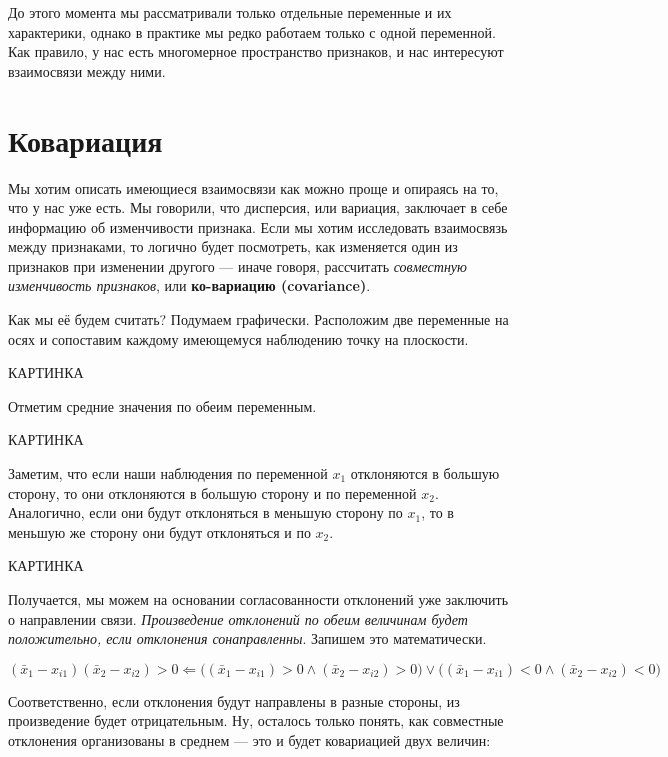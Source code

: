 \documentclass[
  letterpaper,
  DIV=11,
  numbers=noendperiod]{scrreprt}
\newcommand{\median}{\mathrm{median}}
\newcommand{\mean}{\mathbb{M}}
\newcommand{\skew}{\mathrm{skew}}
\newcommand{\kurt}{\mathrm{kurt}}
\theoremstyle{definition}
\theoremstyle{remark}
\begin{document}
\newcommand{\median}{\text{median}}
\newcommand{\mean}{\mathbb{M}}
\newcommand{\skew}{\mathrm{skew}}
\newcommand{\kurt}{\mathrm{kurt}}

До этого момента мы рассматривали только отдельные переменные и их
характерики, однако в практике мы редко работаем только с одной
переменной. Как правило, у нас есть многомерное пространство признаков,
и нас интересуют взаимосвязи между ними.

\section{Ковариация}\label{andan-corr-cov}

Мы хотим описать имеющиеся взаимосвязи как можно проще и опираясь на то,
что у нас уже есть. Мы говорили, что дисперсия, или вариация, заключает
в себе информацию об изменчивости признака. Если мы хотим исследовать
взаимосвязь между признаками, то логично будет посмотреть, как
изменяется один из признаков при изменении другого --- иначе говоря,
рассчитать \emph{совместную изменчивость признаков}, или
\textbf{ко-вариацию (covariance)}.

Как мы её будем считать? Подумаем графически. Расположим две переменные
на осях и сопоставим каждому имеющемуся наблюдению точку на плоскости.

КАРТИНКА

Отметим средние значения по обеим переменным.

КАРТИНКА

Заметим, что если наши наблюдения по переменной \(x_1\) отклоняются в
большую сторону, то они отклоняются в большую сторону и по переменной
\(x_2\). Аналогично, если они будут отклоняться в меньшую сторону по
\(x_1\), то в меньшую же сторону они будут отклоняться и по \(x_2\).

КАРТИНКА

Получается, мы можем на основании согласованности отклонений уже
заключить о направлении связи. \emph{Произведение отклонений по обеим
величинам будет положительно, если отклонения сонаправленны}. Запишем
это математически.

\[
(\bar x_1 - x_{i1}) (\bar x_2 - x_{i2}) > 0 \Leftarrow \big( (\bar x_1 - x_{i1}) > 0 \wedge (\bar x_2 - x_{i2}) > 0 \big) \vee \big( (\bar x_1 - x_{i1}) < 0 \wedge (\bar x_2 - x_{i2}) < 0 \big)
\]

Соответственно, если отклонения будут направлены в разные стороны, из
произведение будет отрицательным. Ну, осталось только понять, как
совместные отклонения организованы в среднем --- это и будет ковариацией
двух величин:
\end{document}
